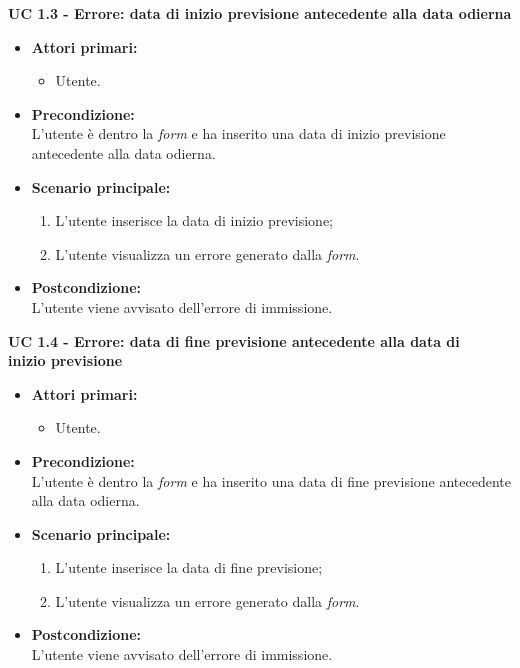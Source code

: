 \noindent \textbf{\large UC 1.3 - Errore: data di inizio previsione antecedente alla data odierna}
\label{uc:err-inserimento-data-inizio-prev}
\begin{itemize}

	\item \textbf{Attori primari: }
		\begin{itemize}
			\item Utente.
		\end{itemize}

	\item \textbf{Precondizione: }\\[0.3cm]
		L'utente è dentro la \textit{form} e ha inserito una data di inizio previsione antecedente
		alla data odierna.

	\item \textbf{Scenario principale: }
		\begin{enumerate}
			\item L'utente inserisce la data di inizio previsione;
			\item L'utente visualizza un errore generato dalla \textit{form}.
		\end{enumerate}
		

	\item \textbf{Postcondizione: }\\[0.3cm]
		L'utente viene avvisato dell'errore di immissione.

\end{itemize}

\vspace{0.5cm}

\noindent \textbf{\large UC 1.4 - Errore: data di fine previsione antecedente alla data di \\\hspace*{56pt}inizio previsione}
\label{uc:err-inserimento-fine-fine-prev}
\begin{itemize}

	\item \textbf{Attori primari: }
		\begin{itemize}
			\item Utente.
		\end{itemize}

	\item \textbf{Precondizione: }\\[0.3cm]
		L'utente è dentro la \textit{form} e ha inserito una data di fine previsione antecedente
		alla data odierna.

	\item \textbf{Scenario principale: }
		\begin{enumerate}
			\item L'utente inserisce la data di fine previsione;
			\item L'utente visualizza un errore generato dalla \textit{form}.
		\end{enumerate}
		

	\item \textbf{Postcondizione: }\\[0.3cm]
		L'utente viene avvisato dell'errore di immissione.

\end{itemize}

